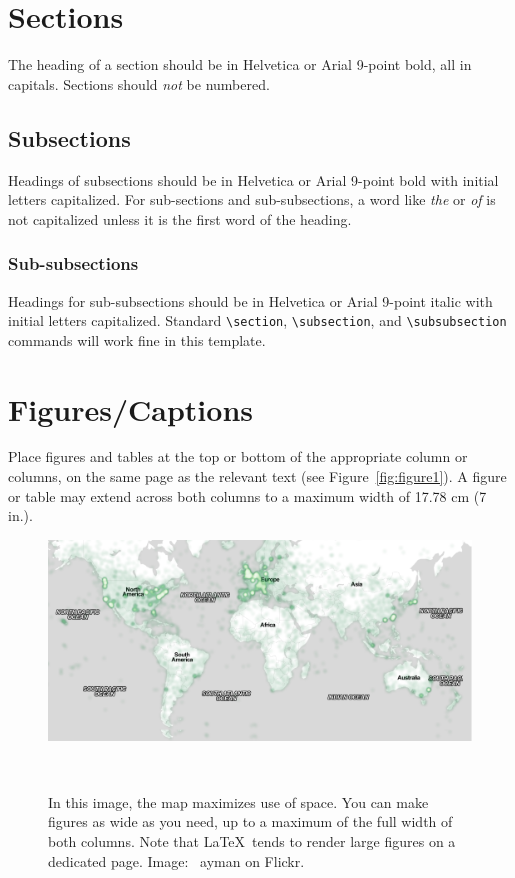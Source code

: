 \documentclass{sigchi}
\begin{document}
\section{Sections}

The heading of a section should be in Helvetica or Arial 9-point bold,
all in capitals. Sections should \textit{not} be numbered.

\subsection{Subsections}

Headings of subsections should be in Helvetica or Arial 9-point bold
with initial letters capitalized.  For sub-sections and
sub-subsections, a word like \emph{the} or \emph{of} is not
capitalized unless it is the first word of the heading.

\subsubsection{Sub-subsections}

Headings for sub-subsections should be in Helvetica or Arial 9-point
italic with initial letters capitalized.  Standard
\texttt{{\textbackslash}section}, \texttt{{\textbackslash}subsection},
and \texttt{{\textbackslash}subsubsection} commands will work fine in
this template.

\section{Figures/Captions}

Place figures and tables at the top or bottom of the appropriate
column or columns, on the same page as the relevant text (see
Figure~\ref{fig:figure1}). A figure or table may extend across both
columns to a maximum width of 17.78 cm (7 in.).

\begin{figure}
  \centering
  \includegraphics[width=2\columnwidth]{figures/map}
  \caption{In this image, the map maximizes use of space. You can make
    figures as wide as you need, up to a maximum of the full width of
    both columns. Note that \LaTeX\ tends to render large figures on a
    dedicated page. Image: \ccbynd~ayman on
    Flickr.}~\label{fig:figure2}
\end{figure}
\end{document}
